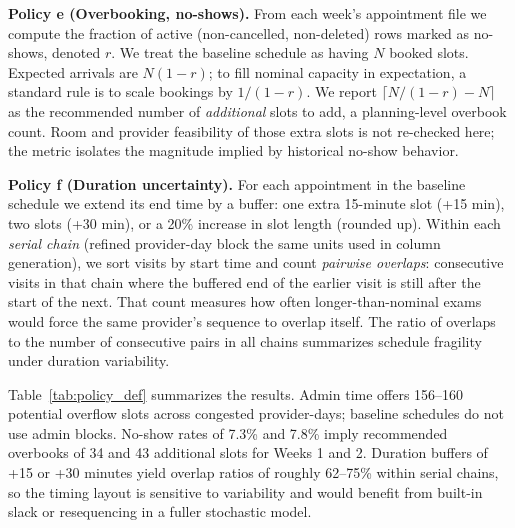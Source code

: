 \documentclass[12pt]{article}
\begin{document}
\textbf{Policy e (Overbooking, no-shows).} From each week's appointment file we compute the fraction of active (non-cancelled, non-deleted) rows marked as no-shows, denoted $r$. We treat the baseline schedule as having $N$ booked slots. Expected arrivals are $N(1-r)$; to fill nominal capacity in expectation, a standard rule is to scale bookings by $1/(1-r)$. We report $\lceil N/(1-r) - N\rceil$ as the recommended number of \emph{additional} slots to add, a planning-level overbook count. Room and provider feasibility of those extra slots is not re-checked here; the metric isolates the magnitude implied by historical no-show behavior.

\textbf{Policy f (Duration uncertainty).} For each appointment in the baseline schedule we extend its end time by a buffer: one extra 15-minute slot (+15 min), two slots (+30 min), or a 20\% increase in slot length (rounded up). Within each \emph{serial chain} (refined provider-day block the same units used in column generation), we sort visits by start time and count \emph{pairwise overlaps}: consecutive visits in that chain where the buffered end of the earlier visit is still after the start of the next. That count measures how often longer-than-nominal exams would force the same provider's sequence to overlap itself. The ratio of overlaps to the number of consecutive pairs in all chains summarizes schedule fragility under duration variability.

Table~\ref{tab:policy_def} summarizes the results. Admin time offers 156--160 potential overflow slots across congested provider-days; baseline schedules do not use admin blocks. No-show rates of 7.3\% and 7.8\% imply recommended overbooks of 34 and 43 additional slots for Weeks 1 and 2. Duration buffers of +15 or +30 minutes yield overlap ratios of roughly 62--75\% within serial chains, so the timing layout is sensitive to variability and would benefit from built-in slack or resequencing in a fuller stochastic model.
\end{document}
